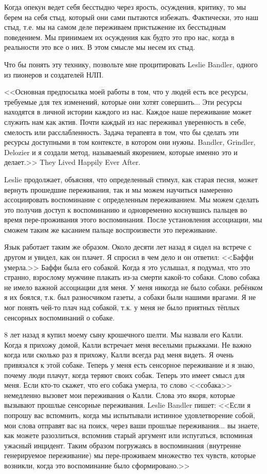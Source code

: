 \documentclass[10pt, fleqn]{article}
\begin{document}
Когда опекун ведет себя бесстыдно через ярость, осуждения, критику, то мы берем на себя стыд, который они сами пытаются избежать. Фактически, это наш стыд, т.е. мы на самом деле переживаем пристыжение их бесстыдным поведением. Мы принимаем их осуждения как будто это про нас, когда в реальности это все о них. В этом смысле мы несем их стыд.

Что бы понять эту технику, позвольте мне процитировать Leslie Bandler, одного из пионеров и создателей НЛП.

<<Основная предпосылка моей работы в том, что у людей есть все ресурсы, требуемые для тех изменений, которые они хотят совершить... Эти ресурсы находятся в личной истории каждого из нас. Каждое наше переживание может служить нам как актив. Почти каждый из нас переживал уверенность в себе, смелость или расслабленность. Задача терапевта в том, что бы сделать эти ресурсы доступными в том контексте, в котором они нужны. Bandler,
Grindler, Delozier и я создали метод, называемый якорением, которые именно это и делает.>> They Lived Happily Ever After.


Leslie продолжает, объясняя, что определенный стимул, как старая песня, может вернуть прошедшие переживания, так и мы можем научиться намеренно ассоциировать воспоминание с определенным переживанием. Мы можем сделать это получив доступ к воспоминанию и одновременно коснувшись пальцев во время пере-проживания этого воспоминания. После установления ассоциации, мы сможем таким же касанием пальце воспроизвести это переживание.

Язык работает таким же образом. Около десяти лет назад я сидел на встрече с другом и увидел, как он плачет. Я спросил в чем дело и он ответил: <<Баффи умерла.>> Баффи была его собакой. Когда я это услышал, я подумал, что это странно, взрослому мужчине плакать из-за смерти какой-то собаки. Слово собака не имело важной ассоциации для меня. У меня никогда не было собаки. ребёнком я их боялся, т.к. был разносчиком газеты, а собаки были нашими врагами. Я не мог понять чей-то плач над собакой, т.к. у меня не было приятных тёплых сенсорных воспоминаний о собаке.

8 лет назад я купил моему сыну крошечного шелти. Мы назвали его Калли. Когда я прихожу домой, Калли встречает меня веселыми прыжками. Не важно когда или сколько раз я прихожу, Калли всегда рад меня видеть. Я очень привязался к этой собаке. Теперь у меня есть сенсорное переживание и я знаю, почему люди плачут, когда теряют своих собак. Теперь это имеет смысл для меня. Если кто-то скажет, что его собака умерла, то слово <<собака>> немедленно вызовет мои переживания о Калли. Слова это якоря, которые вызывают прошлые сенсорные переживания. Leslie Bandler пишет: <<Если я попрошу вас вспомнить, когда мы испытывали истинное удовлетворение собой, мои слова отправят вас на поиск, через ваши прошлые переживания... вы знаете, как можете разозлиться, вспомнив старый аргумент или испугаться, вспоминая ужасный инцидент. Таким образом погружаясь в воспоминания (внутренне генерируемое переживание) мы пере-проживаем множество тех чувств, которые возникли, когда это воспоминание было сформировано.>>
\end{document}
